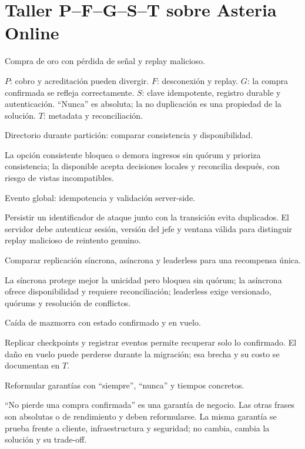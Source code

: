 \documentclass[variant=guia,cover=institutional,mode=screen]{ua-engineering-v6-article}
\begin{document}
\section{Taller P--F--G--S--T sobre Asteria Online}
\begin{uaexercise}Compra de oro con pérdida de señal y replay malicioso.\end{uaexercise}
\begin{uaanswer}\(P\): cobro y acreditación pueden divergir. \(F\): desconexión y replay. \(G\): la compra confirmada se refleja correctamente. \(S\): clave idempotente, registro durable y autenticación. ``Nunca'' es absoluta; la no duplicación es una propiedad de la solución. \(T\): metadata y reconciliación.\end{uaanswer}
\begin{uaexercise}Directorio durante partición: comparar consistencia y disponibilidad.\end{uaexercise}
\begin{uaanswer}La opción consistente bloquea o demora ingresos sin quórum y prioriza consistencia; la disponible acepta decisiones locales y reconcilia después, con riesgo de vistas incompatibles.\end{uaanswer}
\begin{uaexercise}Evento global: idempotencia y validación server-side.\end{uaexercise}
\begin{uaanswer}Persistir un identificador de ataque junto con la transición evita duplicados. El servidor debe autenticar sesión, versión del jefe y ventana válida para distinguir replay malicioso de reintento genuino.\end{uaanswer}
\begin{uaexercise}Comparar replicación síncrona, asíncrona y leaderless para una recompensa única.\end{uaexercise}
\begin{uaanswer}La síncrona protege mejor la unicidad pero bloquea sin quórum; la asíncrona ofrece disponibilidad y requiere reconciliación; leaderless exige versionado, quórums y resolución de conflictos.\end{uaanswer}
\begin{uaexercise}Caída de mazmorra con estado confirmado y en vuelo.\end{uaexercise}
\begin{uaanswer}Replicar checkpoints y registrar eventos permite recuperar solo lo confirmado. El daño en vuelo puede perderse durante la migración; esa brecha y su costo se documentan en \(T\).\end{uaanswer}
\begin{uaexercise}Reformular garantías con ``siempre'', ``nunca'' y tiempos concretos.\end{uaexercise}
\begin{uaanswer}``No pierde una compra confirmada'' es una garantía de negocio. Las otras frases son absolutas o de rendimiento y deben reformularse. La misma garantía se prueba frente a cliente, infraestructura y seguridad; no cambia, cambia la solución y su trade-off.\end{uaanswer}
\end{document}
